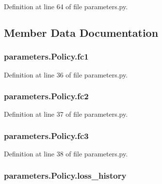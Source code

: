 Definition at line 64 of file parameters.\+py.



\subsection{Member Data Documentation}
\subsubsection[{\texorpdfstring{fc1}{fc1}}]{\setlength{\rightskip}{0pt plus 5cm}parameters.\+Policy.\+fc1}\hypertarget{classparameters_1_1_policy_a6e2321584d126eb24b470a0c38ec5e15}{}\label{classparameters_1_1_policy_a6e2321584d126eb24b470a0c38ec5e15}


Definition at line 36 of file parameters.\+py.

\subsubsection[{\texorpdfstring{fc2}{fc2}}]{\setlength{\rightskip}{0pt plus 5cm}parameters.\+Policy.\+fc2}\hypertarget{classparameters_1_1_policy_a536f2d0eb9e96828c15ef06ea5f6a3ab}{}\label{classparameters_1_1_policy_a536f2d0eb9e96828c15ef06ea5f6a3ab}


Definition at line 37 of file parameters.\+py.

\subsubsection[{\texorpdfstring{fc3}{fc3}}]{\setlength{\rightskip}{0pt plus 5cm}parameters.\+Policy.\+fc3}\hypertarget{classparameters_1_1_policy_a79b2258957c43c5863d8df9f5a1b8948}{}\label{classparameters_1_1_policy_a79b2258957c43c5863d8df9f5a1b8948}


Definition at line 38 of file parameters.\+py.

\subsubsection[{\texorpdfstring{loss\+\_\+history}{loss_history}}]{\setlength{\rightskip}{0pt plus 5cm}parameters.\+Policy.\+loss\+\_\+history}\hypertarget{classparameters_1_1_policy_a9727567f44cbe8bf617ff4020e40fbb7}{}\label{classparameters_1_1_policy_a9727567f44cbe8bf617ff4020e40fbb7}


